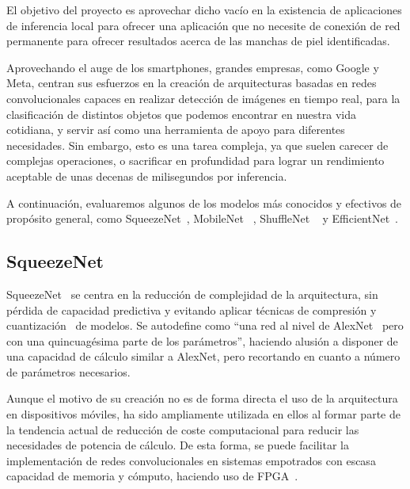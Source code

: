El objetivo del proyecto es aprovechar dicho vacío en la existencia de aplicaciones de inferencia local para ofrecer una aplicación que no necesite de conexión de red permanente para ofrecer resultados acerca de las manchas de piel identificadas.

Aprovechando el auge de los smartphones, grandes empresas, como Google y Meta, centran sus esfuerzos en la creación de arquitecturas basadas en redes convolucionales capaces en realizar detección de imágenes en tiempo real, para la clasificación de distintos objetos que podemos encontrar en nuestra vida cotidiana, y servir así como una herramienta de apoyo para diferentes necesidades. Sin embargo, esto es una tarea compleja, ya que suelen carecer de complejas operaciones, o sacrificar en profundidad para lograr un rendimiento aceptable de unas decenas de milisegundos por inferencia.

A continuación, evaluaremos algunos de los modelos más conocidos y efectivos de propósito general, como SqueezeNet~\cite{iandola2016squeezenet}, MobileNet ~\cite{howard2017mobilenets,sandler2019mobilenetv2,howard2019searching}, ShuffleNet ~\cite{zhang2017shufflenet} y  EfficientNet~\cite{tan2020efficientnet,eflite}.

\subsection{SqueezeNet}

SqueezeNet~\cite{iandola2016squeezenet} se centra en la reducción de complejidad de la arquitectura, sin pérdida de capacidad predictiva y evitando aplicar técnicas de compresión y cuantización~\cite{kuzmin2024fp8} de modelos. Se autodefine como ``una red al nivel de AlexNet~\cite{NIPS2012_c399862d} pero con una quincuagésima parte de los parámetros'', haciendo alusión a disponer de una capacidad de cálculo similar a AlexNet, pero recortando en cuanto a número de parámetros necesarios.

Aunque el motivo de su creación no es de forma directa el uso de la arquitectura en dispositivos móviles, ha sido ampliamente utilizada en ellos al formar parte de la tendencia actual de reducción de coste computacional para reducir las necesidades de potencia de cálculo. De esta forma, se puede facilitar la implementación de redes convolucionales en sistemas empotrados con escasa capacidad de memoria y cómputo, haciendo uso de FPGA~\cite{fpga}.


